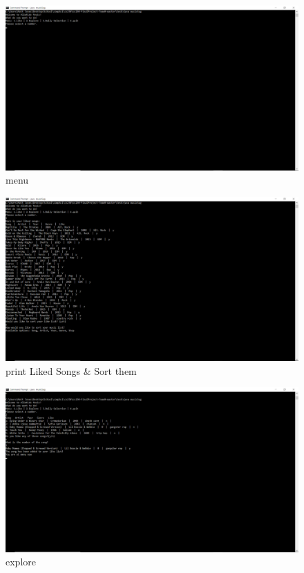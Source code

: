 \documentclass[]{article}
\begin{document}
\begin{figure}
\centering
\includegraphics{../images/menu.png}
\caption{menu}
\end{figure}

\begin{figure}
\centering
\includegraphics{../images/likeList.PNG}
\caption{print Liked Songs \& Sort them}
\end{figure}

\begin{figure}
\centering
\includegraphics{../images/explore.PNG}
\caption{explore}
\end{figure}
\end{document}
